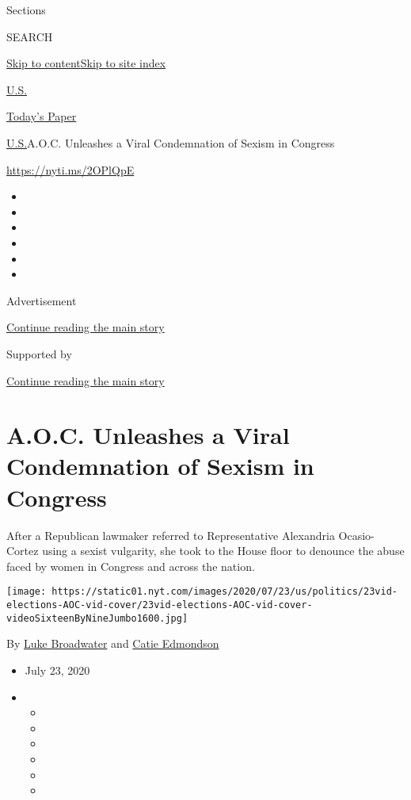 Sections

SEARCH

\protect\hyperlink{site-content}{Skip to
content}\protect\hyperlink{site-index}{Skip to site index}

\href{https://www.nytimes.com/section/us}{U.S.}

\href{https://myaccount.nytimes.com/auth/login?response_type=cookie\&client_id=vi}{}

\href{https://www.nytimes.com/section/todayspaper}{Today's Paper}

\href{/section/us}{U.S.}\textbar{}A.O.C. Unleashes a Viral Condemnation
of Sexism in Congress

\url{https://nyti.ms/2OPlQpE}

\begin{itemize}
\item
\item
\item
\item
\item
\item
\end{itemize}

Advertisement

\protect\hyperlink{after-top}{Continue reading the main story}

Supported by

\protect\hyperlink{after-sponsor}{Continue reading the main story}

\hypertarget{aoc-unleashes-a-viral-condemnation-of-sexism-in-congress}{%
\section{A.O.C. Unleashes a Viral Condemnation of Sexism in
Congress}\label{aoc-unleashes-a-viral-condemnation-of-sexism-in-congress}}

After a Republican lawmaker referred to Representative Alexandria
Ocasio-Cortez using a sexist vulgarity, she took to the House floor to
denounce the abuse faced by women in Congress and across the nation.

\texttt{[image: https://static01.nyt.com/images/2020/07/23/us/politics/23vid-elections-AOC-vid-cover/23vid-elections-AOC-vid-cover-videoSixteenByNineJumbo1600.jpg]}

By \href{https://www.nytimes.com/by/luke-broadwater}{Luke Broadwater}
and \href{https://www.nytimes.com/by/catie-edmondson}{Catie Edmondson}

\begin{itemize}
\item
  July 23, 2020
\item
  \begin{itemize}
  \item
  \item
  \item
  \item
  \item
  \item
  \end{itemize}
\end{itemize}


